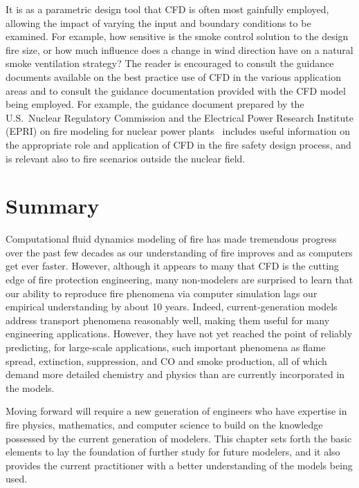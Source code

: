 \documentclass[graybox]{svmult}
\begin{document}
It is as a parametric design tool that CFD is often most gainfully employed, allowing the impact of varying the input and boundary conditions to be examined. For example, how sensitive is the smoke control solution to the design fire size, or how much influence does a change in wind direction have on a natural smoke ventilation strategy? The reader is encouraged to consult the guidance documents available on the best practice use of CFD in the various application areas and to consult the guidance documentation provided with the CFD model being employed. For example, the guidance document prepared by the U.S.~Nuclear Regulatory Commission and the Electrical Power Research Institute (EPRI) on fire modeling for nuclear power plants~\cite{Stroup:2012} includes useful information on the appropriate role and application of CFD in the fire safety design process, and is relevant also to fire scenarios outside the nuclear field.




\section{Summary}

Computational fluid dynamics modeling of fire has made tremendous progress over the past few decades as our understanding of fire improves and as computers get ever faster. However, although it appears to many that CFD is the cutting edge of fire protection engineering, many non-modelers are surprised to learn that our ability to reproduce fire phenomena via computer simulation lags our empirical understanding by about 10 years. Indeed, current-generation models address transport phenomena reasonably well, making them useful for many engineering applications. However, they have not yet reached the point of reliably predicting, for large-scale applications, such important phenomena as flame spread, extinction, suppression, and CO and smoke production, all of which demand more detailed chemistry and physics than are currently incorporated in the models.

Moving forward will require a new generation of engineers who have expertise in fire physics, mathematics, and computer science to build on the knowledge possessed by the current generation of modelers. This chapter sets forth the basic elements to lay the foundation of further study for future modelers, and it also provides the current practitioner with a better understanding of the models being used.
\end{document}
